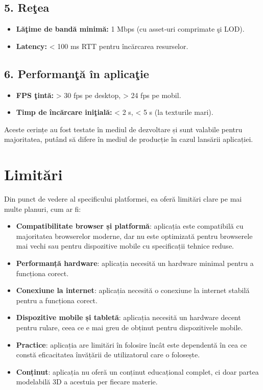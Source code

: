 \subsection*{5. Reţea}
\begin{itemize}
  \item \textbf{Lăţime de bandă minimă:} 1 Mbps (cu asset‐uri comprimate şi LOD).
  \item \textbf{Latency:} < 100 ms RTT pentru încărcarea resurselor.
\end{itemize}

\subsection*{6. Performanţă în aplicaţie}
\begin{itemize}
  \item \textbf{FPS ţintă:} > 30 fps pe desktop, > 24 fps pe mobil.
  \item \textbf{Timp de încărcare iniţială:} < 2 s, < 5 s (la texturile mari).
\end{itemize}

Aceste cerințe au fost testate în mediul de dezvoltare și sunt valabile pentru majoritatea, putând să difere
în mediul de producție în cazul lansării aplicației.


\section{Limitări}
\label{sec:proj-limitations}

Din punct de vedere al specificului platformei, ea oferă limitări clare pe mai multe planuri, cum ar fi:

\begin{itemize}
    \item \textbf{Compatibilitate browser și platformă}: aplicația este compatibilă cu majoritatea browserelor moderne,
    dar nu este optimizată pentru browserele mai vechi sau pentru dispozitive mobile cu specificații tehnice reduse.
    \item \textbf{Performanță hardware}: aplicația necesită un hardware minimal pentru a funcționa corect.
    \item \textbf{Conexiune la internet}: aplicația necesită o conexiune la internet stabilă pentru a funcționa corect.
    \item  \textbf{Dispozitive mobile și tabletă}: aplicația necesită un hardware decent pentru rulare, ceea ce e mai greu de obținut pentru dispozitivele mobile.
    \item \textbf{Practice}: aplicația are limitări în folosire încât este dependentă în cea ce constă eficacitatea învățării de utilizatorul care o folosește.
    \item \textbf{Conținut}: aplicația nu oferă un conținut educațional complet, ci doar partea modelabilă 3D a acestuia per fiecare materie.
\end{itemize}
